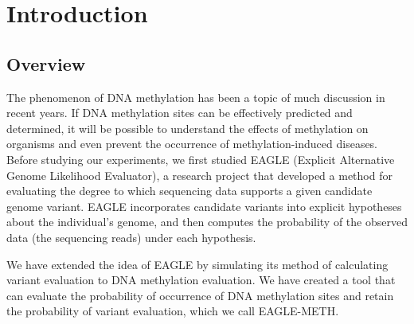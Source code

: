 \documentclass{PHlab-thesis}
\begin{document}
\newcommand*\Acknowledgements{%
感謝我...}





\renewcommand\nomgroup[1]{%
  \item[\bfseries
  \ifstrequal{#1}{A}{General}{%
  \ifstrequal{#1}{Z}{Gene/Protein Names}%
  }]}


\printnomenclature[5cm]

\newpage
\setcounter{page}{1}



\chapter{Introduction}
\section{Overview}
\par The phenomenon of DNA methylation has been a topic of much discussion in recent years. If DNA methylation sites can be effectively predicted and determined, it will be possible to understand the effects of methylation on organisms and even prevent the occurrence of methylation-induced diseases. Before studying our experiments, we first studied EAGLE (Explicit Alternative Genome Likelihood Evaluator), a research project that developed a method for evaluating the degree to which sequencing data supports a given candidate genome variant. EAGLE incorporates candidate variants into explicit hypotheses about the individual’s genome, and then computes the probability of the observed data (the sequencing reads) under each hypothesis.
\par We have extended the idea of EAGLE by simulating its method of calculating variant evaluation to DNA methylation evaluation. We have created a tool that can evaluate the probability of occurrence of DNA methylation sites and retain the probability of variant evaluation, which we call EAGLE-METH.
\end{document}
